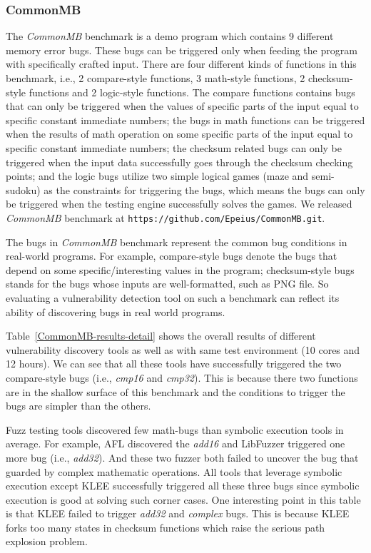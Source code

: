 \subsubsection{CommonMB}
\noindent The \emph{CommonMB} benchmark is a demo program which contains 
9 different memory error bugs. These bugs can be triggered only when 
feeding the program with specifically crafted input. There are four 
different kinds of functions in this benchmark, i.e., 2 compare-style 
functions, 3 math-style functions, 2 checksum-style functions and 2 
logic-style functions. The compare functions contains bugs that can 
only be triggered when the values of specific parts of the input equal 
to specific constant immediate numbers; the bugs in math functions 
can be triggered when the results of math operation on some specific 
parts of the input equal to specific constant immediate numbers; the 
checksum related bugs can only be triggered when the input data 
successfully goes through the checksum checking points; and the logic 
bugs utilize two simple logical games (maze and semi-sudoku) as the 
constraints for triggering the bugs, which means the bugs can only be 
triggered when the testing engine successfully solves the games. We 
released \emph{CommonMB} benchmark at \texttt{https://github.com/Epeius/CommonMB.git}.

The bugs in \emph{CommonMB} benchmark represent the common bug conditions 
in real-world programs. For example, compare-style bugs denote the bugs 
that depend on some specific/interesting values in the program; 
checksum-style bugs stands for the bugs whose inputs are well-formatted, 
such as PNG file.
So evaluating a vulnerability detection tool on such a benchmark can 
reflect its ability of discovering bugs in real world programs.

Table~\ref{CommonMB-results-detail} shows the overall results of 
different vulnerability discovery tools as well as \prototype 
with same test environment (10 cores and 12 hours).
We can see that all these tools have successfully triggered the 
two compare-style bugs (i.e., \textit{cmp16} and \textit{cmp32}). 
This is because there two functions are in the shallow surface of 
this benchmark and the conditions to trigger the bugs are simpler 
than the others.  

Fuzz testing tools discovered few math-bugs than symbolic execution 
tools in average.
For example, AFL discovered the \textit{add16} and LibFuzzer triggered 
one more bug (i.e., \textit{add32}). And these two fuzzer both failed 
to uncover the bug that guarded by complex mathematic operations. 
All tools that leverage symbolic execution except KLEE successfully 
triggered all these three bugs since symbolic execution is good at 
solving such corner cases. One interesting point in this table is that 
KLEE failed to trigger \textit{add32} and \textit{complex} bugs. 
This is because KLEE forks too many states in checksum functions 
which raise the serious path explosion problem. 

